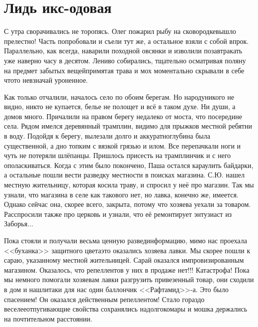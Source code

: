 \chapter{Лидь икс-одовая} 

С утра сворачивались не торопясь. Олег пожарил рыбу на сковородке\mdash вышло прелестно! Часть попробовали и съели тут же, а остальное взяли с собой впрок. Параллельно, как всегда, наварили походной овсянки и изволили позавтракать уже наверно часу в десятом. Лениво собирались, тщательно осматривая поляну на предмет забытых вещей\mdash примятая трава и мох моментально скрывали в себе что\sdash то невзначай уроненное.

Как только отчалили, началось село по обоим берегам. Но народу\mdash никого не видно, никто не купается, белье не полощет и всё в таком духе. Ни души, а домов много. Причалили на правом берегу недалеко от моста, что посередине села. Рядом имелся деревянный трамплин, видимо для прыжков местной ребятни в воду. Подойдя к берегу, вылезали долго и аккуратно\mdash глубина была существенной, а дно топким с вязкой грязью и илом. Все перепачкали ноги и чуть не потеряли шлёпанцы. Пришлось присесть на трамплинчик и с него ополаскиваться. Когда с этим было покончено, Паша остался караулить байдарки, а остальные пошли вести разведку местности в поисках магазина. С.Ю. нашел местную жительницу, которая косила траву, и спросил у неё про магазин. Так мы узнали, что магазина в селе как такового нет, но лавка, конечно же, имеется. Однако сейчас она, скорее всего, закрыта, потому что хозяева уехали за товаром. Расспросили также про церковь и узнали, что её ремонтирует энтузиаст из Заборья$\ldots$
 
Пока стояли и получали весьма ценную развединформацию, мимо нас проехала <<буханка>> защитного цвета\mdash это оказались хозяева лавки. Мы скорее пошли к сараю, указанному местной жительницей. Сарай оказался импровизированным магазином. Оказалось, что репеллентов у них в продаже нет!!! Катастрофа! Пока мы немного помогали хозяевам лавки разгрузить привезенный товар, они сходили в дом и нашли\sdash таки для нас один баллончик <<Рафтамид>>-а. Это было спасением! Он оказался действенным репеллентом! Стало гораздо веселее\mdash отпугивающие свойства сохранялись надолго\mdash комары и мошка держались на почтительном расстоянии. 

